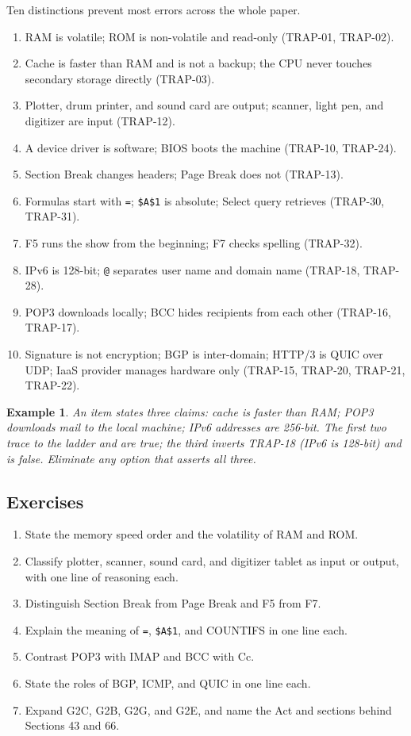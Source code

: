 \documentclass[11pt]{article}
\newtheorem{example}{Example}[section]
\begin{document}
Ten distinctions prevent most errors across the whole paper.
\begin{enumerate}
  \item RAM is volatile; ROM is non-volatile and read-only (TRAP-01, TRAP-02).
  \item Cache is faster than RAM and is not a backup; the CPU never touches
    secondary storage directly (TRAP-03).
  \item Plotter, drum printer, and sound card are output; scanner, light pen,
    and digitizer are input (TRAP-12).
  \item A device driver is software; BIOS boots the machine (TRAP-10,
    TRAP-24).
  \item Section Break changes headers; Page Break does not (TRAP-13).
  \item Formulas start with \texttt{=}; \texttt{\$A\$1} is absolute;
    Select query retrieves (TRAP-30, TRAP-31).
  \item F5 runs the show from the beginning; F7 checks spelling (TRAP-32).
  \item IPv6 is 128-bit; \texttt{@} separates user name and domain name
    (TRAP-18, TRAP-28).
  \item POP3 downloads locally; BCC hides recipients from each other
    (TRAP-16, TRAP-17).
  \item Signature is not encryption; BGP is inter-domain; HTTP/3 is QUIC over
    UDP; IaaS provider manages hardware only (TRAP-15, TRAP-20, TRAP-21,
    TRAP-22).
\end{enumerate}

\begin{example}
An item states three claims: cache is faster than RAM; POP3 downloads mail to
the local machine; IPv6 addresses are 256-bit. The first two trace to the
ladder and are true; the third inverts TRAP-18 (IPv6 is 128-bit) and is false.
Eliminate any option that asserts all three.
\end{example}

\subsection*{Exercises}
\begin{enumerate}[label=\arabic*.]
  \item State the memory speed order and the volatility of RAM and ROM.
  \item Classify plotter, scanner, sound card, and digitizer tablet as input
    or output, with one line of reasoning each.
  \item Distinguish Section Break from Page Break and F5 from F7.
  \item Explain the meaning of \texttt{=}, \texttt{\$A\$1}, and COUNTIFS in
    one line each.
  \item Contrast POP3 with IMAP and BCC with Cc.
  \item State the roles of BGP, ICMP, and QUIC in one line each.
  \item Expand G2C, G2B, G2G, and G2E, and name the Act and sections behind
    Sections 43 and 66.
\end{enumerate}
\end{document}
